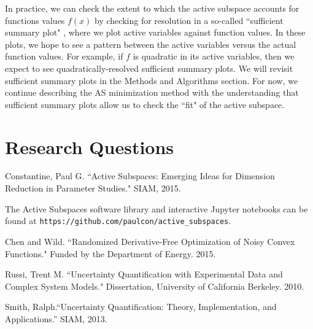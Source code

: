 \documentclass{report}
\begin{document}
In practice, we can check the extent to which the active subspace accounts for functions values $f(x)$ by checking for resolution in a so-called ``sufficient summary plot" \cite{Constantine}, where we plot active variables against function values. In these plots, we hope to see a pattern between the active variables versus the actual function values. For example, if $f$ is quadratic in its active variables, then we expect to see quadratically-resolved sufficient summary plots. We will revisit sufficient summary plots in the Methods and Algorithms section. For now, we continue describing the AS minimization method with the understanding that sufficient summary plots allow us to check the ``fit" of the active subspace.

\section{Research Questions}












\begin{thebibliography}{65}

 Constantine, Paul G. ``Active Subspaces: Emerging Ideas for Dimension Reduction in Parameter Studies." SIAM, 2015. 


The Active Subspaces software library and interactive Jupyter notebooks can be found at \texttt{https://github.com/paulcon/active\_subspaces}.

 Chen and Wild. ``Randomized Derivative-Free Optimization of Noisy Convex Functions." Funded by the Department of Energy. 2015.

 Russi, Trent M. ``Uncertainty Quantification with Experimental Data and Complex System Models." Dissertation, University of California Berkeley. 2010.

  Smith, Ralph.``Uncertainty Quantification: Theory, Implementation, and Applications.” SIAM, 2013.



 



\end{thebibliography}
\end{document}

